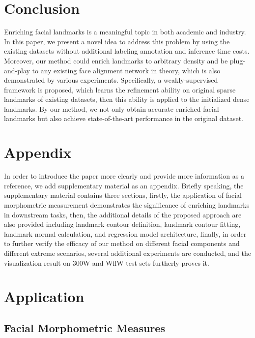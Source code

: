 \documentclass[letterpaper]{article} \usepackage{aaai23}  \usepackage{times}  \usepackage{helvet}  \usepackage{courier}  \usepackage[hyphens]{url}  \usepackage{graphicx} \urlstyle{rm} \def\UrlFont{\rm}  \usepackage{natbib}  \usepackage{caption} \frenchspacing  \setlength{\pdfpagewidth}{8.5in}  \setlength{\pdfpageheight}{11in}  \usepackage{algorithm}
\begin{document}
\section{Conclusion}
\label{sec:conclusion}

Enriching facial landmarks is a meaningful topic in both academic and industry.
In this paper, we present a novel idea to address this problem by using the existing datasets without additional labeling annotation and inference time costs.
Moreover, our method could enrich landmarks to arbitrary density and be plug-and-play to any existing face alignment network in theory, which is also demonstrated by various experiments.
Specifically, a weakly-supervised framework is proposed, which learns the refinement ability on original sparse landmarks of existing datasets, then this ability is applied to the initialized dense landmarks.
By our method, we not only obtain accurate enriched facial landmarks but also achieve state-of-the-art performance in the original dataset.



\clearpage
\appendix

\section{Appendix}

In order to introduce the paper more clearly and provide more information as a reference, we add supplementary material as an appendix.
Briefly speaking, the supplementary material contains three sections,
firstly, the application of facial morphometric measurement demonstrates the significance of enriching landmarks in downstream tasks,
then, the additional details of the proposed approach are also provided including landmark contour definition, landmark contour fitting, landmark normal calculation, and regression model architecture,
finally, in order to further verify the efficacy of our method on different facial components and different extreme scenarios, several additional experiments are conducted, and the visualization result on 300W and WflW test sets furtherly proves it.

\section{Application}
\label{sec:Application}

\subsection{Facial Morphometric Measures}
\end{document}
